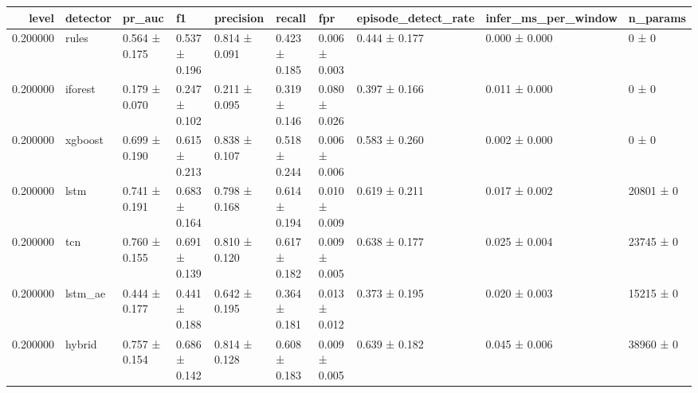 \begin{tabular}{rlllllllll}
\toprule
level & detector & pr\_auc & f1 & precision & recall & fpr & episode\_detect\_rate & infer\_ms\_per\_window & n\_params \\
\midrule
0.200000 & rules & 0.564 ± 0.175 & 0.537 ± 0.196 & 0.814 ± 0.091 & 0.423 ± 0.185 & 0.006 ± 0.003 & 0.444 ± 0.177 & 0.000 ± 0.000 & 0 ± 0 \\
0.200000 & iforest & 0.179 ± 0.070 & 0.247 ± 0.102 & 0.211 ± 0.095 & 0.319 ± 0.146 & 0.080 ± 0.026 & 0.397 ± 0.166 & 0.011 ± 0.000 & 0 ± 0 \\
0.200000 & xgboost & 0.699 ± 0.190 & 0.615 ± 0.213 & 0.838 ± 0.107 & 0.518 ± 0.244 & 0.006 ± 0.006 & 0.583 ± 0.260 & 0.002 ± 0.000 & 0 ± 0 \\
0.200000 & lstm & 0.741 ± 0.191 & 0.683 ± 0.164 & 0.798 ± 0.168 & 0.614 ± 0.194 & 0.010 ± 0.009 & 0.619 ± 0.211 & 0.017 ± 0.002 & 20801 ± 0 \\
0.200000 & tcn & 0.760 ± 0.155 & 0.691 ± 0.139 & 0.810 ± 0.120 & 0.617 ± 0.182 & 0.009 ± 0.005 & 0.638 ± 0.177 & 0.025 ± 0.004 & 23745 ± 0 \\
0.200000 & lstm\_ae & 0.444 ± 0.177 & 0.441 ± 0.188 & 0.642 ± 0.195 & 0.364 ± 0.181 & 0.013 ± 0.012 & 0.373 ± 0.195 & 0.020 ± 0.003 & 15215 ± 0 \\
0.200000 & hybrid & 0.757 ± 0.154 & 0.686 ± 0.142 & 0.814 ± 0.128 & 0.608 ± 0.183 & 0.009 ± 0.005 & 0.639 ± 0.182 & 0.045 ± 0.006 & 38960 ± 0 \\
\bottomrule
\end{tabular}

